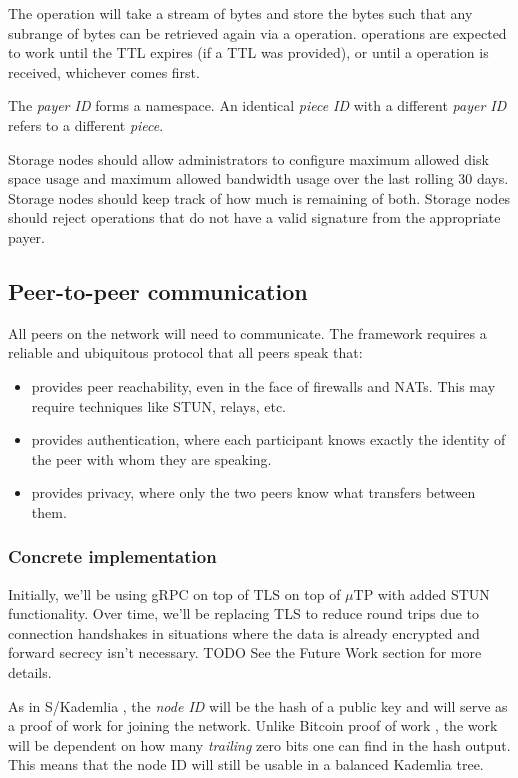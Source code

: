 \documentclass[a4paper,10pt]{article} \usepackage[utf8]{inputenc}
\newcommand{\todo}[1]{{\color{red} TODO #1 }}
\begin{document}
The  operation will take a stream of bytes and store the bytes such
that any subrange of bytes can be retrieved again via a  operation.
 operations are expected to work until the TTL expires (if a TTL was
provided), or until a  operation is received, whichever comes
first.

The {\em payer ID} forms a namespace. An identical {\em piece ID} with a
different {\em payer ID} refers to a different {\em piece}.

Storage nodes should allow administrators to configure maximum allowed disk
space usage and maximum allowed bandwidth usage over the last rolling 30 days.
Storage nodes should keep track of how much is remaining of both. Storage nodes
should reject operations that do not have a valid signature from the appropriate
payer.

\subsection{Peer-to-peer communication}

All peers on the network will need to communicate. The framework requires a
reliable and ubiquitous protocol that all peers speak that:

\begin{itemize}
\item provides peer reachability, even in the face of firewalls
and NATs. This may require techniques like STUN, relays, etc.
\item provides authentication, where each participant knows
exactly the identity of the peer with whom they are speaking.
\item provides privacy, where only the two peers
know what transfers between them.
\end{itemize}

\subsubsection{Concrete implementation}

Initially, we'll be using gRPC \cite{grpc} on top of TLS on top of $\mu$TP
\cite{utp} with added STUN functionality. Over time, we'll be replacing TLS to
reduce round trips due to connection handshakes in situations where the data is
already encrypted and forward secrecy isn't necessary. \todo{} See the Future
Work section for more details.

As in S/Kademlia \cite{skad}, the {\em node ID} will be the hash of a public key
and will serve as a proof of work for joining the network. Unlike Bitcoin proof
of work \cite{bitcoin}, the work will be dependent on how many {\em trailing}
zero bits one can find in the hash output. This means that the node ID will
still be usable in a balanced Kademlia \cite{kad} tree.
\end{document}

